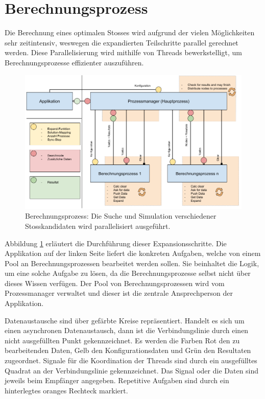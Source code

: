 \clearpage
\section{Berechnungsprozess}
Die Berechnung eines optimalen Stosses wird aufgrund der vielen Möglichkeiten sehr zeitintensiv, weswegen
die expandierten Teilschritte parallel gerechnet werden.
Diese Parallelisierung wird mithilfe von Threads bewerkstelligt, um Berechnungsprozesse effizienter auszuführen.

\begin{figure}[h!]
    \begin{center}
        \includegraphics[width=0.8\linewidth]{../common/03_billiard_ai/resources/14_berechnungsprozess.png}
    \end{center}
    \caption{Berechnungsprozess: Die Suche und Simulation verschiedener Stosskandidaten wird parallelisiert ausgeführt.}
    \label{fig:berechnungsprozess}
\end{figure}

Abbildung \ref{fig:berechnungsprozess} erläutert die Durchführung dieser Expansionsschritte.
Die Applikation auf der linken Seite liefert die konkreten Aufgaben, welche von einem Pool an Berechnungsprozessen
bearbeitet werden sollen. Sie beinhaltet die Logik, um eine solche Aufgabe zu lösen, da die Berechnungsprozesse
selbst nicht über dieses Wissen verfügen.
Der Pool von Berechnungsprozessen wird vom Prozessmanager verwaltet und dieser ist die zentrale Ansprechperson der Applikation.

Datenaustausche sind über gefärbte Kreise repräsentiert. Handelt es sich um einen asynchronen
Datenaustausch, dann ist die Verbindungslinie durch einen nicht ausgefüllten Punkt gekennzeichnet.
Es werden die Farben Rot den zu bearbeitenden Daten,
Gelb den Konfigurationsdaten und Grün den Resultaten zugeordnet.
Signale für die Koordination der Threads sind durch ein ausgefülltes Quadrat an der Verbindungslinie gekennzeichnet.
Das Signal oder die Daten sind jeweils beim Empfänger angegeben.
Repetitive Aufgaben sind durch ein hinterlegtes oranges Rechteck markiert.

